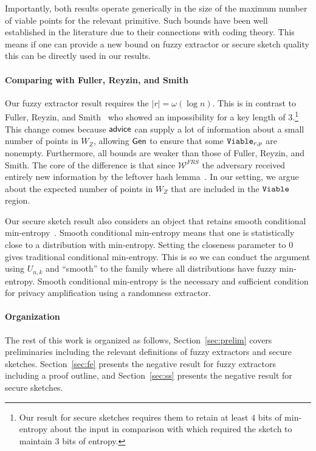 Importantly, both results operate generically in the size of the maximum number of viable points for the relevant primitive.  Such bounds have been well established in the literature due to their connections with coding theory.  This means if one can provide a new bound on fuzzy extractor or secure sketch quality this can be directly used in our results.


\paragraph{Comparing with Fuller, Reyzin, and Smith~\cite{fuller2020computational}}
Our fuzzy extractor result requires the $|r| = \omega(\log n)$.  This is in contrast to Fuller, Reyzin, and Smith~\cite{fuller2020computational} who showed an impossibility for a key length of $3$.\footnote{Our result for secure sketches requires them to retain at least $4$ bits of min-entropy about the input in comparison with \cite{fuller2020computational} which required the sketch to maintain $3$ bits of entropy.} This change comes because ${\mathsf{advice}}$ can supply a lot of information about a small number of points in $W_Z$, allowing ${\mathsf{Gen}}$ to ensure that some $\mathtt{Viable}_{r,p}$ are nonempty. Furthermore, all bounds are weaker than those of Fuller, Reyzin, and Smith.  The core of the difference is that since $\mathcal{W}^{FRS}$ the adversary received entirely new information by the leftover hash lemma~\cite{haastad1993construction,barak2011leftover}. In our setting, we argue about the expected number of points in $W_Z$ that are included in the $\mathtt{Viable}$ region. 

Our secure sketch result also considers an object that retains smooth conditional min-entropy~\cite{renner2005simple}.  Smooth conditional min-entropy means that one is statistically close to a distribution with min-entropy.  Setting the closeness parameter to $0$ gives traditional conditional min-entropy.  This is so we can conduct the argument using $U_{n,k}$ and ``smooth'' to the family where all distributions have fuzzy min-entropy. Smooth conditional min-entropy is the necessary and sufficient condition for privacy amplification using a randomness extractor. 


\paragraph{Organization} The rest of this work is organized as follows, Section~\ref{sec:prelim} covers preliminaries including the relevant definitions of fuzzy extractors and secure sketches.  Section~\ref{sec:fe} presents the negative result for fuzzy extractors including a proof outline, and Section~\ref{sec:ss} presents the negative result for secure sketches.


